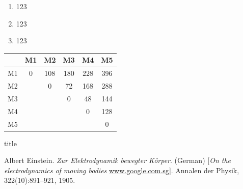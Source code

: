 \documentclass[11pt,a4paper]{article}
\theoremstyle{definition}
\begin{document}
\vspace{-\topsep}
\begin{enumerate}
	\item 123
	\item 123
	\item 123
\end{enumerate}
\vspace{-\topsep}

\begin{center}
 \begin{tabular}{|| c || c | c | c |c |c ||} 
 \hline
  & M1 & M2 & M3 & M4 & M5 \\ [0.5ex] 
 \hline\hline
 M1 & 0 & 108 & 180 & 228 & 396 \\ 
 \hline
 M2 &  & 0 & 72 & 168 & 288 \\
 \hline
 M3 &  &  & 0 & 48 & 144 \\
 \hline
 M4 &  &  &  & 0 & 128 \\
 \hline
 M5 &  &  & &  & 0   \\ [0.5ex] 
 \hline
\end{tabular}
\end{center}

\begin{algorithm}
\caption{title}
\begin{algorithmic}[1]
\end{algorithmic}
\end{algorithm}

\begin{thebibliography}{9}
 
Albert Einstein. 
\textit{Zur Elektrodynamik bewegter K{\"o}rper}. (German) 
[\textit{On the electrodynamics of moving bodies} \url{www.google.com.sg}]. 
Annalen der Physik, 322(10):891–921, 1905.
\end{thebibliography}
\end{document}
